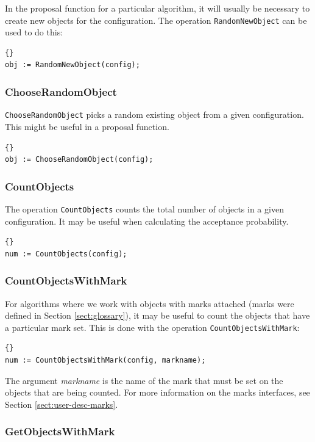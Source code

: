 In the proposal function for a particular algorithm, it will usually
be necessary to create new objects for the configuration.  The
operation \texttt{Random\-New\-Object} can be used to do this:
\begin{lstlisting}{}
obj := RandomNewObject(config);
\end{lstlisting}

\subsubsection{ChooseRandomObject}

\texttt{ChooseRandomObject} picks a random existing object from a
given configuration.  This might be useful in a proposal function.
\begin{lstlisting}{}
obj := ChooseRandomObject(config);
\end{lstlisting}

\subsubsection{CountObjects}

The operation \texttt{CountObjects} counts the total number of objects
in a given configuration. It may be useful when calculating the
acceptance probability.
\begin{lstlisting}{}
num := CountObjects(config);
\end{lstlisting}

\subsubsection{CountObjectsWithMark}

For algorithms where we work with objects with marks attached (marks
were defined in Section \ref{sect:glossary}), it may be useful to
count the objects that have a particular mark set.  This is done with
the operation \texttt{CountObjectsWithMark}:
\begin{lstlisting}{}
num := CountObjectsWithMark(config, markname);
\end{lstlisting}

\noindent The argument \emph{markname} is the name of the mark that
must be set on the objects that are being counted.  For more
information on the marks interfaces, see Section
\ref{sect:user-desc-marks}.

\subsubsection{GetObjectsWithMark}

